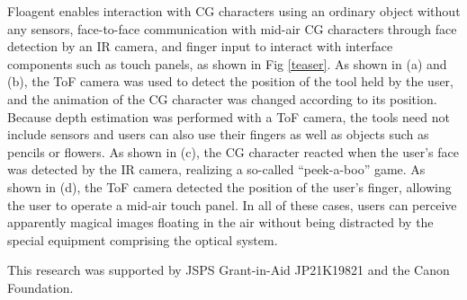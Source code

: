 \documentclass[sigconf]{acmart}
\begin{document}
Floagent enables interaction with CG characters using an ordinary object without any sensors, face-to-face communication with mid-air CG characters through face detection by an IR camera, and finger input to interact with interface components such as touch panels, as shown in Fig \ref{teaser}.
As shown in (a) and (b), the ToF camera was used to detect the position of the tool held by the user, and the animation of the CG character was changed according to its position.
Because depth estimation was performed with a ToF camera, the tools need not include sensors and users can also use their fingers as well as objects such as pencils or flowers.
As shown in (c), the CG character reacted when the user's face was detected by the IR camera, realizing a so-called ``peek-a-boo'' game.
As shown in (d), the ToF camera detected the position of the user's finger, allowing the user to operate a mid-air touch panel.
In all of these cases, users can perceive apparently magical images floating in the air without being distracted by the special equipment comprising the optical system.

\begin{acks}
  This research was supported by JSPS Grant-in-Aid JP21K19821 and the Canon Foundation.
\end{acks}



\end{document}
